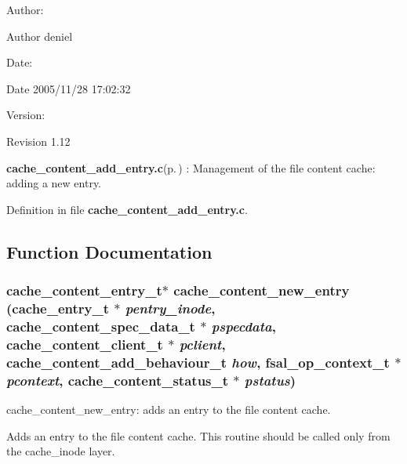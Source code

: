 \begin{Desc}
\item[Author:]\begin{Desc}
\item[Author]deniel \end{Desc}
\end{Desc}
\begin{Desc}
\item[Date:]\begin{Desc}
\item[Date]2005/11/28 17:02:32 \end{Desc}
\end{Desc}
\begin{Desc}
\item[Version:]\begin{Desc}
\item[Revision]1.12 \end{Desc}
\end{Desc}
{\bf cache\_\-content\_\-add\_\-entry.c}{\rm (p.\,\pageref{cache__content__add__entry_8c})} : Management of the file content cache: adding a new entry.

Definition in file {\bf cache\_\-content\_\-add\_\-entry.c}.

\subsection{Function Documentation}
\subsubsection{\setlength{\rightskip}{0pt plus 5cm}cache\_\-content\_\-entry\_\-t$\ast$ cache\_\-content\_\-new\_\-entry (cache\_\-entry\_\-t $\ast$ {\em pentry\_\-inode}, cache\_\-content\_\-spec\_\-data\_\-t $\ast$ {\em pspecdata}, cache\_\-content\_\-client\_\-t $\ast$ {\em pclient}, cache\_\-content\_\-add\_\-behaviour\_\-t {\em how}, fsal\_\-op\_\-context\_\-t $\ast$ {\em pcontext}, cache\_\-content\_\-status\_\-t $\ast$ {\em pstatus})}\label{cache__content__add__entry_8c_a0}


cache\_\-content\_\-new\_\-entry: adds an entry to the file content cache.

Adds an entry to the file content cache. This routine should be called only from the cache\_\-inode layer.


